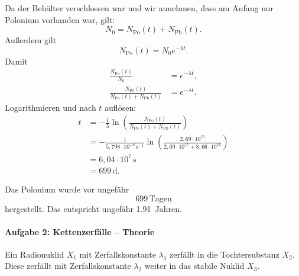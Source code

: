 \documentclass[11pt,a4paper]{scrartcl}
\begin{document}
\begin{enumerate}[label=(\alph*)]
            \begin{calculationbox}
                Da der Behälter verschlossen war und wir annehmen, dass am Anfang nur Polonium vorhanden war, gilt:
                \[
                    N_0=N_{\mathrm{Po}}(t)+N_{\mathrm{Pb}}(t).
                \]
                Außerdem gilt
                \[
                    N_{\mathrm{Po}}(t)=N_0e^{-\lambda t}.
                \]
                Damit
                \begin{align*}
                    \frac{N_{\mathrm{Po}}(t)}{N_0}&=e^{-\lambda t},\\
                    \frac{N_{\mathrm{Po}}(t)}{N_{\mathrm{Po}}(t)+N_{\mathrm{Pb}}(t)}&=e^{-\lambda t}.
                \end{align*}
                Logarithmieren und nach $t$ auflösen:
                \begin{align*}
                    t
                    &=-\frac{1}{\lambda}
                    \ln\left(
                    \frac{N_{\mathrm{Po}}(t)}{N_{\mathrm{Po}}(t)+N_{\mathrm{Pb}}(t)}
                    \right)\\
                    &=-\frac{1}{5{,}798\cdot10^{-8}\,\mathrm{s}^{-1}}
                    \ln\left(
                    \frac{2{,}69\cdot10^{15}}{2{,}69\cdot10^{15}+8{,}66\cdot10^{16}}
                    \right)\\
                    &=6{,}04\cdot10^7\,\mathrm{s}\\
                    &=699\,\mathrm{d}.
                \end{align*}
            \end{calculationbox}

            \begin{answerbox}
                Das Polonium wurde vor ungefähr
                \[
                    \boxed{699\,\mathrm{Tagen}}
                \]
                hergestellt. Das entspricht ungefähr \SI{1.91}{Jahren}.
            \end{answerbox}
    \end{enumerate}

    \newpage
    \paragraph{Aufgabe 2: Kettenzerfälle -- Theorie}

    Ein Radionuklid $X_1$ mit Zerfallskonstante $\lambda_1$ zerfällt in die Tochtersubstanz $X_2$.
    Diese zerfällt mit Zerfallskonstante $\lambda_2$ weiter in das stabile Nuklid $X_3$.
\end{document}
